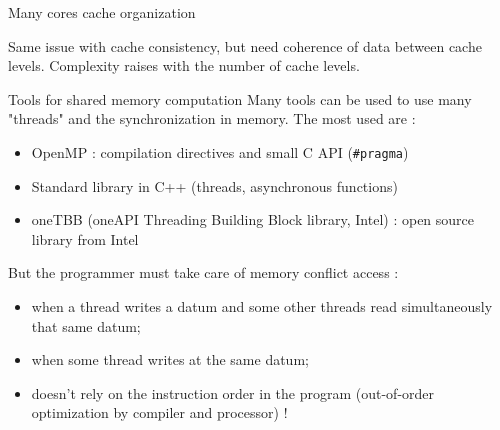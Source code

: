 \documentclass[compress,10pt,aspectratio=169]{beamer}
\begin{document}
\begin{frame}[fragile]{Many cores cache organization}
\begin{center}
        \end{center}
        
        Same issue with cache consistency, but need coherence of data between cache levels. Complexity raises with the number of 
        cache levels.
        
        \end{frame}


\begin{frame}[fragile]{Tools for shared memory computation}
\small
Many tools can be used to use many "threads" and the synchronization in memory. The most used are :

\begin{itemize}
  \item OpenMP : compilation directives and small C API (\texttt{#pragma})
  \item Standard library in C++ (threads, asynchronous functions)
  \item oneTBB (oneAPI Threading Building Block library, Intel) : open source library from Intel
  \end{itemize}
 
But the programmer must take care of memory conflict access :
\begin{itemize}
    \item when a thread writes a datum and some other threads read simultaneously that same datum;
    \item when some thread writes at the same datum;
    \item doesn't rely on the instruction order in the program (out-of-order optimization by compiler and processor) !
\end{itemize}
\end{frame}
\end{document}
